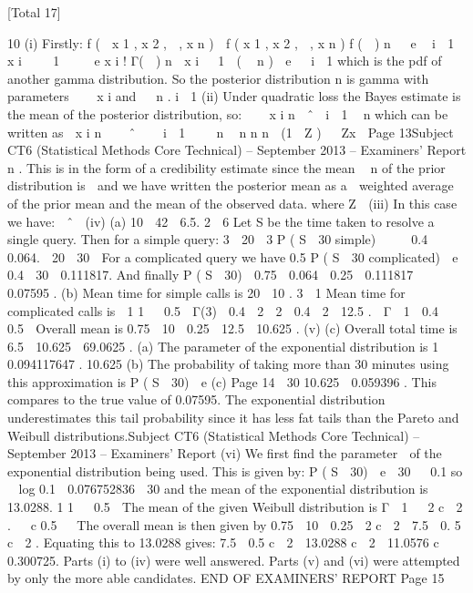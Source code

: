 [Total 17]

10
(i)
Firstly:
f (  x 1 , x 2 ,  , x n )  f ( x 1 , x 2 ,  , x n ) f (  )
n
  e

i  1
 x i    1 

 e
x i ! Γ(  )
n
 x i  1  (  n ) 
e
  i  1
which is the pdf of another gamma distribution. So the posterior distribution
n
is gamma with parameters    x i and   n .
i  1
(ii)
Under quadratic loss the Bayes estimate is the mean of the posterior
distribution, so:
   x i
n
 ˆ 
i  1
 n
which can be written as
 x i n


 ˆ  
 i  1 
  n
 n
n
n
 (1  Z )

 Zx

Page 13Subject CT6 (Statistical Methods Core Technical) – September 2013 – Examiners’ Report
n
. This is in the form of a credibility estimate since the mean
 n
of the prior distribution is  and we have written the posterior mean as a

weighted average of the prior mean and the mean of the observed data.
where Z 
(iii)
In this case we have:
 ˆ 
(iv)
(a)
10  42
 6.5.
2  6
Let S be the time taken to resolve a single query. Then for a simple
query:
3
 20 
3
P ( S  30 simple)  
  0.4  0.064.
 20  30 
For a complicated query we have
0.5
P ( S  30 complicated)  e  0.4  30
 0.111817.
And finally
P ( S  30)  0.75  0.064  0.25  0.111817  0.07595 .
(b)
Mean time for simple calls is
20
 10 .
3  1
Mean time for complicated calls is
 1
1 

0.5  Γ(3)  0.4  2  2  0.4  2  12.5 .

Γ  1 
0.4

 0.5 
Overall mean is 0.75  10  0.25  12.5  10.625 .
(v)
(c) Overall total time is 6.5  10.625  69.0625 .
(a) The parameter of the exponential distribution is
1
 0.094117647 .
10.625
(b) The probability of taking more than 30 minutes using this
approximation is P ( S  30)  e
(c)
Page 14

30
10.625
 0.059396 .
This compares to the true value of 0.07595. The exponential
distribution underestimates this tail probability since it has less fat tails
than the Pareto and Weibull distributions.Subject CT6 (Statistical Methods Core Technical) – September 2013 – Examiners’ Report
(vi)
We first find the parameter  of the exponential distribution being used. This
is given by:
P ( S  30)  e  30   0.1
so

log 0.1
 0.076752836
 30
and the mean of the exponential distribution is 13.0288.
1
1   0.5

The mean of the given Weibull distribution is Γ  1 
 2 c  2 .
  c
0.5


The overall mean is then given by 0.75  10  0.25  2 c  2  7.5  0. 5 c  2 .
Equating this to 13.0288 gives:
7.5  0.5 c  2  13.0288
c  2  11.0576
c  0.300725.
Parts (i) to (iv) were well answered. Parts (v) and (vi) were attempted by only the more able
candidates.
END OF EXAMINERS’ REPORT
Page 15
